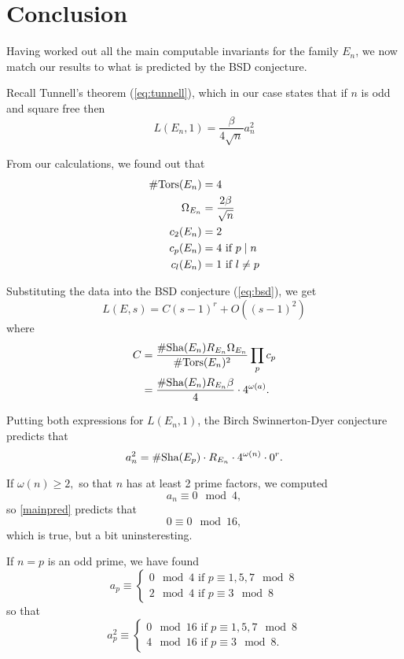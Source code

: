 \documentclass[12pt, a4paper]{amsart}
\begin{document}
\section{Conclusion}
Having worked out all the main computable invariants
for the family $E_n$, we now match our results to what is predicted
by the BSD conjecture.

Recall Tunnell's theorem (\autoref{eq:tunnell}), which in our case states that
if $n$ is odd and square free then
\[L(E_n,1) = \frac{\beta}{4\sqrt{n}}a_n^2\]

From our calculations, we found out that 
\begin{equation*}
  \begin{split}
    \#{\text{\normalfont Tors}}(E_n) &= 4 \\
    \Omega_{E_n} &= \frac{2\beta}{\sqrt{n}} \\
    c_2(E_n) &= 2 \\
    c_p(E_n) &= 4 \text{ if } p \mid n \\
    c_l(E_n) &= 1 \text{ if } l \neq p \\
  \end{split}
\end{equation*}

Substituting the data into the BSD conjecture (\autoref{eq:bsd}), we get
\[
  L(E,s) = C(s-1)^r + O((s-1)^2)
\]
where
\begin{equation*}
  \begin{split}
    C &=
    \frac{\# \text{\normalfont Sha}(E_n) R_{E_n} \Omega_{E_n}}{\# {\text{\normalfont Tors}}(E_n)^2}
    \prod\limits_p c_p \\
    &= \frac{\# \text{\normalfont Sha}(E_n) R_{E_n} \beta}{4} \cdot 4^{\omega(a)}.
  \end{split}
\end{equation*}

Putting both expressions for $L(E_n, 1)$, the Birch Swinnerton-Dyer conjecture
predicts that 
\begin{equation} \label{mainpred} 
  a_n^2 = \#\text{\normalfont Sha}(E_p) \cdot R_{E_n}\cdot 4^{\omega(n)} \cdot 0^r.
\end{equation}

If $\omega(n) \geq 2,$ so that $n$ has at least 2 prime factors, we computed
\[a_n \equiv 0 \mod{4},\]
so \autoref{mainpred} predicts that
\[0 \equiv 0 \mod{16},\]
which is true, but a bit uninsteresting.

If $n = p$ is an odd prime, we have found
\[a_p \equiv \begin{cases}
    0 \mod{4} \text{ if } p \equiv 1,5,7 \mod{8} \\
    2 \mod{4} \text{ if } p \equiv 3 \mod{8}
  \end{cases}
\]
so that
\[a_p^2 \equiv
  \begin{cases}
    0 \mod{16} \text{ if } p \equiv 1,5,7 \mod{8} \\
    4 \mod {16} \text{ if } p \equiv 3 \mod{8}.
  \end{cases}
\]
\end{document}
